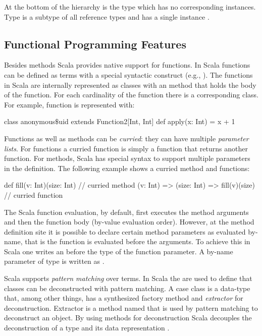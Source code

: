 At the bottom of the hierarchy is the type  which has no corresponding
 instances. Type  is a subtype of all reference types and has a single instance .


\subsection{Functional Programming Features}

Besides methods Scala provides native support for functions. In Scala functions can be defined
as terms with a special syntactic construct (e.g., ). The functions
in Scala are internally represented as classes with an  method that holds
the body of the function. For each cardinality of the function there is a corresponding
class. For example, function  is represented with:\begin{lstparagraph}
class anonymous$\$$uid extends Function2[Int, Int] {
  def apply(x: Int) = x + 1
}
\end{lstparagraph}

Functions as well as methods can be \emph{curried}: they can have multiple \emph{parameter lists}. For functions
a curried function is simply a function that returns another function. For methods, Scala has special syntax
to support multiple parameters in the definition. The following example shows a curried method and functions:\begin{lstparagraph}
def fill(v: Int)(size: Int) // curried method
(v: Int) => (size: Int) => fill(v)(size) // curried function
\end{lstparagraph}

The Scala function evaluation, by default, first executes the method arguments and then
 the function body (by-value evaluation order). However, at the method definition site it
 is possible to declare certain method parameters as evaluated by-name, that is the function
 is evaluated before the arguments. To achieve this in Scala one writes an \code{=>} before
 the type of the function parameter. A by-name parameter of type  is written as
 .


Scala supports \emph{pattern matching} over terms.  In Scala the  are
used to define that classes can be deconstructed with pattern matching. A case class is
a data-type that, among other things, has a synthesized factory method  and
\emph{extractor} for deconstruction. Extractor is a method named  that
is used by pattern matching to deconstruct an object. By using
methods for deconstruction Scala decouples the deconstruction of a type and its
data representation \cite{emir2007matching}.

